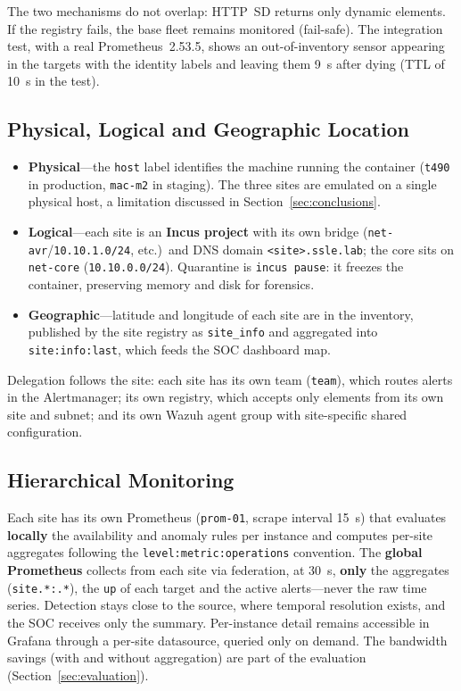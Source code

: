 \documentclass[11pt,a4paper]{article}
\begin{document}
The two mechanisms do not overlap: HTTP~SD returns only dynamic elements. If the registry
fails, the base fleet remains monitored (fail-safe). The integration test, with a real
Prometheus~2.53.5, shows an out-of-inventory sensor appearing in the targets with the
identity labels and leaving them 9~s after dying (TTL of 10~s in the test).

\subsection{Physical, Logical and Geographic Location}

\begin{itemize}
  \item \textbf{Physical}---the \texttt{host} label identifies the machine running the
    container (\texttt{t490} in production, \texttt{mac-m2} in staging). The three sites are
    emulated on a single physical host, a limitation discussed in Section~\ref{sec:conclusions}.
  \item \textbf{Logical}---each site is an \textbf{Incus project} with its own bridge
    (\texttt{net-avr}/\allowbreak\texttt{10.10.1.0/24}, etc.)\ and DNS domain
    \texttt{<site>.ssle.lab}; the core sits on \texttt{net-core}
    (\texttt{10.10.0.0/24}). Quarantine is \texttt{incus~pause}: it freezes the
    container, preserving memory and disk for forensics.
  \item \textbf{Geographic}---latitude and longitude of each site are in the inventory,
    published by the site registry as \texttt{site\_info} and aggregated into
    \texttt{site:info:last}, which feeds the SOC dashboard map.
\end{itemize}

Delegation follows the site: each site has its own team (\texttt{team}), which routes alerts
in the Alertmanager; its own registry, which accepts only elements from its own site and
subnet; and its own Wazuh agent group with site-specific shared configuration.

\subsection{Hierarchical Monitoring}

Each site has its own Prometheus (\texttt{prom-01}, scrape interval 15~s) that evaluates
\textbf{locally} the availability and anomaly rules per instance and computes per-site
aggregates following the \texttt{level:metric:operations} convention. The \textbf{global
Prometheus} collects from each site via federation, at 30~s, \textbf{only} the aggregates
(\texttt{site.*:.*}), the \texttt{up} of each target and the active alerts---never the raw
time series. Detection stays close to the source, where temporal resolution exists, and the
SOC receives only the summary. Per-instance detail remains accessible in Grafana through a
per-site datasource, queried only on demand. The bandwidth savings (with and without
aggregation) are part of the evaluation (Section~\ref{sec:evaluation}).
\end{document}

